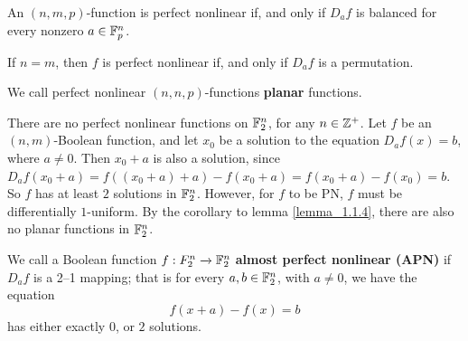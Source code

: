 \begin{lemma}\label{lemma_1.1.4}
  An $(n,m,p)$-function is perfect nonlinear if, and only if $D_a{f}$
  is balanced for every nonzero $a \in \mathbb{F}_p^n$.
\end{lemma}
\begin{corollary}
  If $n=m$, then $f$ is perfect nonlinear if, and only if $D_a{f}$ is
  a permutation.
\end{corollary}

\begin{definition}
  We call perfect nonlinear $(n,n,p)$-functions \textbf{planar}
  functions.
\end{definition}

\begin{example}
  There are no perfect nonlinear functions on $\mathbb{F}_2^n$, for any $n
  \in \mathbb{Z}^+$. Let $f$ be an $(n,m)$-Boolean function, and let $x_0$ be
  a solution to the equation $D_a{f(x)}=b$, where $a \neq 0$. Then
  $x_0+a$ is also a solution, since $D_a{f(x_0+a)}=f((x_0+a)+a)-
  f(x_0+a)=f(x_0+a)-f(x_0)=b$. So $f$ has at least $2$ solutions in
  $\mathbb{F}_2^n$. However, for  $f$ to be PN, $f$ must be differentially
  $1$-uniform. By the corollary to lemma \ref{lemma_1.1.4}, there are
  also no planar functions in $\mathbb{F}_2^n$.
\end{example}

\begin{definition}
  We call a Boolean function $f:F_2^n \xrightarrow{} \mathbb{F}_2^n$
  \textbf{almost perfect nonlinear (APN)} if $D_a{f}$ is a 2--1
  mapping; that is for every $a,b \in \mathbb{F}_2^n$, with $a \neq 0$, we
  have the equation
  \begin{equation*}
    f(x+a)-f(x)=b
  \end{equation*}
  has either exactly $0$, or  $2$ solutions.
\end{definition}

